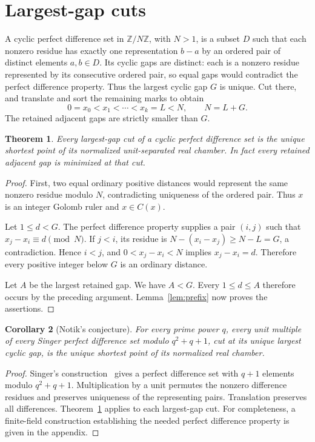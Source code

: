 \documentclass[11pt,a4paper]{article}
\newtheorem{theorem}{Theorem}
\newtheorem{corollary}[theorem]{Corollary}
\newcommand{\Z}{\mathbb Z}
\begin{document}
\section{Largest-gap cuts}

A cyclic perfect difference set in $\Z/N\Z$, with $N>1$, is a subset $D$ such that
each nonzero residue has exactly one representation $b-a$ by an ordered
pair of distinct elements $a,b\in D$.
Its cyclic gaps are distinct: each is a nonzero residue represented by
its consecutive ordered pair, so equal gaps would contradict the perfect
difference property. Thus the largest cyclic gap $G$ is unique.
Cut there, and translate and sort the
remaining marks to obtain
\[
 0=x_0<x_1<\cdots<x_k=L<N,\qquad N=L+G.
\]
The retained adjacent gaps are strictly smaller than $G$.

\begin{theorem}\label{thm:main}
Every largest-gap cut of a cyclic perfect difference set is the unique
shortest point of its normalized unit-separated real chamber.
In fact every retained adjacent gap is minimized at that cut.
\end{theorem}
\begin{proof}
First, two equal ordinary positive distances would represent the same
nonzero residue modulo $N$, contradicting uniqueness of the ordered
pair. Thus $x$ is an integer Golomb ruler and $x\in C(x)$.

Let $1\le d<G$. The perfect difference property supplies a pair
$(i,j)$ such that $x_j-x_i\equiv d\pmod N$.
If $j<i$, its residue is $N-(x_i-x_j)\ge N-L=G$, a contradiction.
Hence $i<j$, and $0<x_j-x_i<N$ implies $x_j-x_i=d$.
Therefore every positive integer below $G$ is an ordinary distance.

Let $A$ be the largest retained gap. We have $A<G$.
Every $1\le d\le A$ therefore occurs by the preceding argument.
Lemma~\ref{lem:prefix} now proves the assertions.
\end{proof}

\begin{corollary}[Notik's conjecture]\label{cor:singer}
For every prime power $q$, every unit multiple of every Singer perfect
difference set modulo $q^2+q+1$, cut at its unique largest cyclic gap, is the
unique shortest point of its normalized real chamber.
\end{corollary}
\begin{proof}
Singer's construction~\cite{singer} gives a perfect difference set
with $q+1$ elements modulo $q^2+q+1$.
Multiplication by a unit permutes the nonzero difference residues and
preserves uniqueness of the representing pairs. Translation preserves
all differences. Theorem~\ref{thm:main} applies to each largest-gap cut.
For completeness, a finite-field construction establishing the needed
perfect difference property is given in the appendix.
\end{proof}
\end{document}
